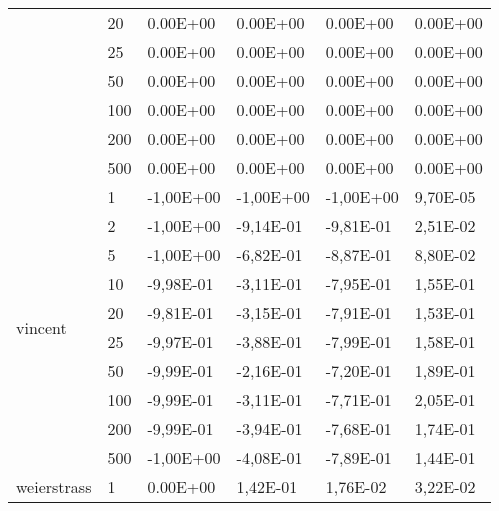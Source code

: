 \begin{longtable}[c]{|p{3.5cm}|l|l|l|l|l|}
                                        & 20        & 0.00E+00   & 0.00E+00   & 0.00E+00   & 0.00E+00  \\ \cline{2-6} 
                                        & 25        & 0.00E+00   & 0.00E+00   & 0.00E+00   & 0.00E+00  \\ \cline{2-6} 
                                        & 50        & 0.00E+00   & 0.00E+00   & 0.00E+00   & 0.00E+00  \\ \cline{2-6} 
                                        & 100       & 0.00E+00   & 0.00E+00   & 0.00E+00   & 0.00E+00  \\ \cline{2-6} 
                                        & 200       & 0.00E+00   & 0.00E+00   & 0.00E+00   & 0.00E+00  \\ \cline{2-6} 
                                        & 500       & 0.00E+00   & 0.00E+00   & 0.00E+00   & 0.00E+00  \\ \hline
\multirow[t]{10}{*}{vincent}               & 1         & -1,00E+00  & -1,00E+00  & -1,00E+00  & 9,70E-05  \\ \cline{2-6} 
                                        & 2         & -1,00E+00  & -9,14E-01  & -9,81E-01  & 2,51E-02  \\ \cline{2-6} 
                                        & 5         & -1,00E+00  & -6,82E-01  & -8,87E-01  & 8,80E-02  \\ \cline{2-6} 
                                        & 10        & -9,98E-01  & -3,11E-01  & -7,95E-01  & 1,55E-01  \\ \cline{2-6} 
                                        & 20        & -9,81E-01  & -3,15E-01  & -7,91E-01  & 1,53E-01  \\ \cline{2-6} 
                                        & 25        & -9,97E-01  & -3,88E-01  & -7,99E-01  & 1,58E-01  \\ \cline{2-6} 
                                        & 50        & -9,99E-01  & -2,16E-01  & -7,20E-01  & 1,89E-01  \\ \cline{2-6} 
                                        & 100       & -9,99E-01  & -3,11E-01  & -7,71E-01  & 2,05E-01  \\ \cline{2-6} 
                                        & 200       & -9,99E-01  & -3,94E-01  & -7,68E-01  & 1,74E-01  \\ \cline{2-6} 
                                        & 500       & -1,00E+00  & -4,08E-01  & -7,89E-01  & 1,44E-01  \\ \hline
\multirow[t]{10}{*}{weierstrass}           & 1         & 0.00E+00   & 1,42E-01   & 1,76E-02   & 3,22E-02  \\ \cline{2-6} 

\end{longtable}
